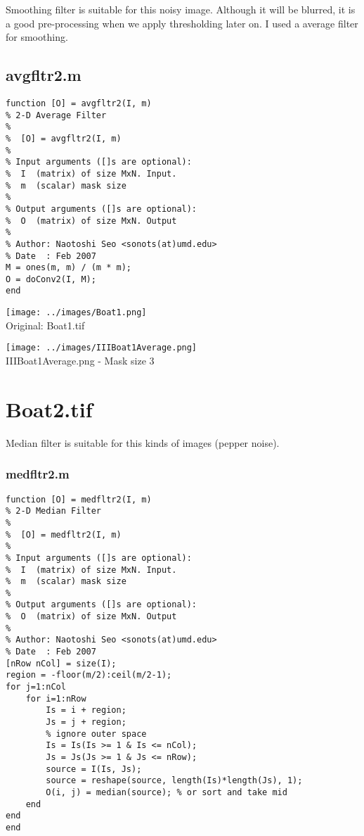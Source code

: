 \documentclass[article,oneside]{memoir}
\begin{document}
\begin{highboostfilter2.m}
Smoothing filter is suitable for this noisy image. 
Although it will be blurred, it is a good pre-processing when we apply thresholding later on. 
I used a average filter for smoothing. 

\subsection{avgfltr2.m}

\begin{verbatim}
function [O] = avgfltr2(I, m)
% 2-D Average Filter
%
%  [O] = avgfltr2(I, m)
%
% Input arguments ([]s are optional):
%  I  (matrix) of size MxN. Input.
%  m  (scalar) mask size
%
% Output arguments ([]s are optional):
%  O  (matrix) of size MxN. Output
%
% Author: Naotoshi Seo <sonots(at)umd.edu>
% Date  : Feb 2007
M = ones(m, m) / (m * m);
O = doConv2(I, M);
end
\end{verbatim}

\begin{center}
\texttt{[image: ../images/Boat1.png]}\\
Original: Boat1.tif
\end{center}

\begin{center}
\texttt{[image: ../images/IIIBoat1Average.png]}\\
IIIBoat1Average.png - Mask size 3
\end{center}

\section{Boat2.tif}

Median filter is suitable for this kinds of images (pepper noise). 

\subsubsection{medfltr2.m}
\begin{verbatim}
function [O] = medfltr2(I, m)
% 2-D Median Filter
%
%  [O] = medfltr2(I, m)
%
% Input arguments ([]s are optional):
%  I  (matrix) of size MxN. Input.
%  m  (scalar) mask size
%
% Output arguments ([]s are optional):
%  O  (matrix) of size MxN. Output
%
% Author: Naotoshi Seo <sonots(at)umd.edu>
% Date  : Feb 2007
[nRow nCol] = size(I);
region = -floor(m/2):ceil(m/2-1);
for j=1:nCol
    for i=1:nRow
        Is = i + region;
        Js = j + region;
        % ignore outer space
        Is = Is(Is >= 1 & Is <= nCol);
        Js = Js(Js >= 1 & Js <= nRow);
        source = I(Is, Js);
        source = reshape(source, length(Is)*length(Js), 1);
        O(i, j) = median(source); % or sort and take mid
    end
end
end
\end{verbatim}


\end{highboostfilter2.m}
\end{document}
